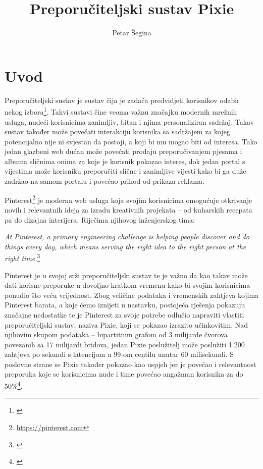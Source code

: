 \documentclass[times, utf8, seminar]{fer}
\begin{document}
\title{Preporučiteljski sustav Pixie}

\author{Petar Šegina}


\maketitle

\tableofcontents

\chapter{Uvod}

Preporučiteljski sustav je sustav čija je zadaća predvidjeti korisnikov odabir nekog izbora\footnote{\cite{mmd}}. Takvi sustavi čine veoma važnu značajku modernih mrežnih usluga, nudeći korisnicima zanimljiv, bitan i njima personaliziran sadržaj. Takav sustav također može povećati interakciju korisnika sa sadržajem za kojeg potencijalno nije ni svjestan da postoji, a koji bi mu mogao biti od interesa. Tako jedan glazbeni web dućan može povećati prodaju preporučivanjem pjesama i albuma sličnima onima za koje je korisnik pokazao interes, dok jedan portal s vijestima može korisniku preporučiti slične i zanimljive vijesti kako bi ga duže zadržao na samom portalu i povećao prihod od prikaza reklama.

Pinterest\footnote{\url{https://pinterest.com}} je moderna web usluga koja svojim korisnicima omogućuje otkrivanje novih i relevantnih ideja za izradu kreativnih projekata -- od kuharskih recepata pa do dizajna interijera. Riječima njihovog inženjerskog tima:

\begin{displayquote}
		  \textit{At Pinterest, a primary engineering challenge is helping people discover and do things every day, which means serving the right idea to the right person at the right time.}\footnote{\cite{medium-article}}
\end{displayquote}

Pinterest je u svojoj srži preporučiteljski sustav te je važno da kao takav može dati korisne preporuke u dovoljno kratkom vremenu kako bi svojim korisnicima ponudio što veću vrijednost. Zbog veličine podataka i vremenskih zahtjeva kojima Pinterest barata, a koje ćemo iznijeti u nastavku, postojeća rješenja pokazuju značajne nedostatke te je Pinterest za svoje potrebe odlučio napraviti vlastiti preporučiteljski sustav, naziva Pixie, koji se pokazao izrazito učinkovitim. Nad njihovim skupom podataka -- bipartitnim grafom od 3 milijarde čvorova povezanih sa 17 milijardi bridova, jedan Pixie poslužitelj može poslužiti 1.200 zahtjeva po sekundi s latencijom u 99-om centilu unutar 60 milisekundi. S poslovne strane se Pixie također pokazao kao uspjeh jer je povećao i relevantnost preporuka koje se korisnicima nude i time povećao angažman korisnika za do 50\%\footnote{\cite{DBLP:journals/corr/abs-1711-07601}}.
\end{document}
